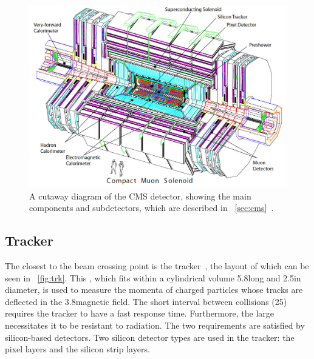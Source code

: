 \begin{figure}[h]
\centering
\includegraphics[width=1.0\textwidth]{detectorFigures/cms-perspective.png}
\caption{A cutaway diagram of the CMS detector, showing the main components and subdetectors, which are described in \Sec~\ref{sec:cms}~\cite{CMSTDR}.}
\label{fig:cms-exploded}
\end{figure}

\subsection{Tracker}
\label{sec:cms:tracker}

The closest \subdetector to the beam crossing point is the tracker~\cite{CMSTrackerTDR}, the layout of which can be seen in \Fig~\ref{fig:trk}. This \subdetector, which fits within a cylindrical volume 5.8\m long and 2.5\m in diameter, is used to measure the momenta of charged particles whose tracks are deflected in the 3.8\T magnetic field. 
The short interval between collisions (25\ns) requires the tracker to have a fast response time. Furthermore, the large \pp \crosssection necessitates it to be resistant to radiation. The two requirements are satisfied by silicon-based detectors. Two silicon detector types are used in the \CMS tracker: the pixel layers and the silicon strip layers.



